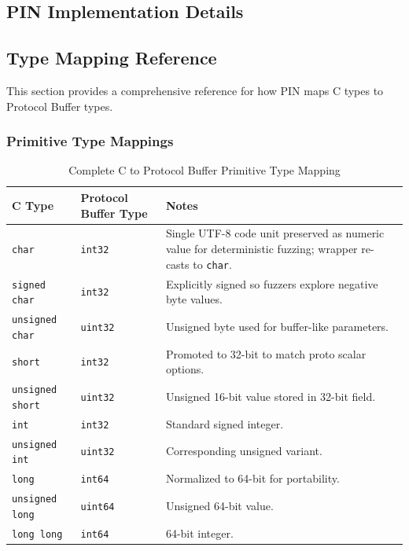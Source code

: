 \documentclass[doublespace,nopageskip]{VTthesis} %
\begin{document}
	\begin{appendices}
		\chapter{PIN Implementation Details} \label{app:implementation}
			\section{Type Mapping Reference} \label{ase:type_mapping}
			This section provides a comprehensive reference for how PIN maps C types to Protocol Buffer types.
			
			\subsection{Primitive Type Mappings}
			\begin{table}[htb]
				\centering
				\caption{Complete C to Protocol Buffer Primitive Type Mapping}
				\begin{tabular}{p{2.5cm}p{3cm}p{7cm}}
					\toprule
					C Type & Protocol Buffer Type & Notes \\
					\midrule
					\texttt{char} & \texttt{int32} & Single UTF-8 code unit preserved as numeric value for deterministic fuzzing; wrapper re-casts to \texttt{char}. \\
					\texttt{signed char} & \texttt{int32} & Explicitly signed so fuzzers explore negative byte values. \\
					\texttt{unsigned char} & \texttt{uint32} & Unsigned byte used for buffer-like parameters. \\
					\texttt{short} & \texttt{int32} & Promoted to 32-bit to match proto scalar options. \\
					\texttt{unsigned short} & \texttt{uint32} & Unsigned 16-bit value stored in 32-bit field. \\
					\texttt{int} & \texttt{int32} & Standard signed integer. \\
					\texttt{unsigned int} & \texttt{uint32} & Corresponding unsigned variant. \\
					\texttt{long} & \texttt{int64} & Normalized to 64-bit for portability. \\
					\texttt{unsigned long} & \texttt{uint64} & Unsigned 64-bit value. \\
					\texttt{long long} & \texttt{int64} & 64-bit integer. \\

\end{tabular}
\end{table}
\end{appendices}
\end{document}
